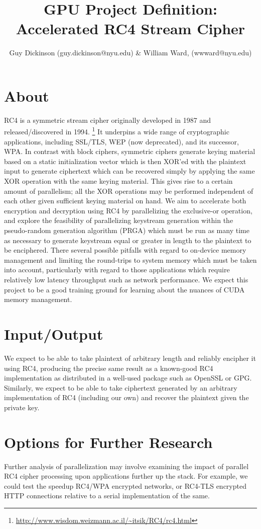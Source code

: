 \documentclass{article}
\begin{document}
  
  \title{GPU Project Definition: Accelerated RC4 Stream Cipher}
  \author{Guy Dickinson (guy.dickinson@nyu.edu) \& William Ward, (wwward@nyu.edu)}
  \maketitle
  
  \section{About}
  RC4 is a symmetric stream cipher originally developed in 1987 and released/discovered in 1994. \footnote{\url{http://www.wisdom.weizmann.ac.il/~itsik/RC4/rc4.html}}
  It underpins a wide range of cryptographic applications, including SSL/TLS, WEP (now deprecated), and its successor, WPA. In contrast with block ciphers, symmetric ciphers generate keying material based on a static initialization vector which is then XOR'ed with the plaintext input to generate ciphertext which can be recovered simply by applying the same XOR operation with the same keying material. This gives rise to a certain amount of parallelism; all the XOR operations may be performed independent of each other given sufficient keying material on hand. We aim to accelerate both encryption and decryption using RC4 by parallelizing the exclusive-or operation, and explore the feasibility of parallelizing keystream generation within the pseudo-random generation algorithm (PRGA) which must be run as many time as necessary to generate keystream equal or greater in length to the plaintext to be enciphered.
  There several possible pitfalls with regard to on-device memory management and limiting the round-trips to system memory which must be taken into account, particularly with regard to those applications which require relatively low latency throughput such as network performance. We expect this project to be a good training ground for learning about the nuances of CUDA memory management.
  
  \section{Input/Output}
  We expect to be able to take plaintext of arbitrary length and reliably encipher it using RC4, producing the precise same result as a known-good RC4 implementation as distributed in a well-used package such as OpenSSL or GPG. Similarly, we expect to be able to take ciphertext generated by an arbitrary implementation of RC4 (including our own) and recover the plaintext given the private key.
  
  \section{Options for Further Research}
  Further analysis of parallelization may involve examining the impact of parallel RC4 cipher processing upon applications further up the stack. For example, we could test the speedup RC4/WPA encrypted networks, or RC4-TLS encrypted HTTP connections relative to a serial implementation of the same.
  
  
\end{document}

